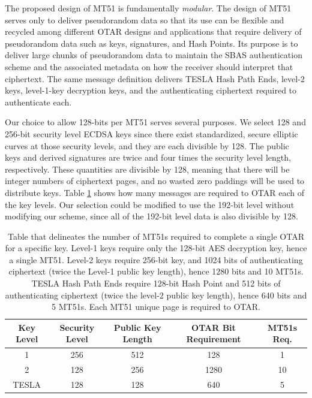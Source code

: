 \documentclass[letterpaper,times]{IONconf/IONconf}
\begin{document}
The proposed design of MT51 is fundamentally {\em modular}.
The design of MT51 serves only to deliver pseudorandom data so that its use can be flexible and recycled among different OTAR designs and applications that require delivery of pseudorandom data such as keys, signatures, and Hash Points. 
Its purpose is to deliver large chunks of pseudorandom data to maintain the SBAS authentication scheme and the associated metadata on how the receiver should interpret that ciphertext.
The same message definition delivers TESLA Hash Path Ends, level-2 keys, level-1-key decryption keys, and the authenticating ciphertext required to authenticate each.

Our choice to allow 128-bits per MT51 serves several purposes.
We select 128 and 256-bit security level ECDSA keys since there exist standardized, secure elliptic curves at those security levels, and they are each divisible by 128.
The public keys and derived signatures are twice and four times the security level length, respectively.
These quantities are divisible by 128, meaning that there will be integer numbers of ciphertext pages, and no wasted zero paddings will be used to distribute keys.
Table \ref{tab: ciphertext lengths} shows how many messages are required to OTAR each of the key levels.
Our selection could be modified to use the 192-bit level without modifying our scheme, since all of the 192-bit level data is also divisible by 128.
\begin{table}[H]
\center
\begin{tabular}{|c|c|c|c|c|} \hline
	Key Level & Security Level & Public Key Length & OTAR Bit Requirement & MT51s Req. \\ \hline
	    1 & 256 & 512 &  128 & 1 \\ \hline
	    2 & 128 & 256 & 1280 & 10\\ \hline
	TESLA & 128 & 128 &  640 & 5 \\ \hline
\end{tabular}
\caption{Table that delineates the number of MT51s required to complete a single OTAR for a specific key. Level-1 keys require only the 128-bit AES decryption key, hence a single MT51. Level-2 keys require 256-bit key, and 1024 bits of authenticating ciphertext (twice the Level-1 public key length), hence 1280 bits and 10 MT51s. TESLA Hash Path Ends require 128-bit Hash Point and 512 bits of authenticating ciphertext (twice the level-2 public key length), hence 640 bits and 5 MT51s. Each MT51 unique page is required to OTAR.}
\label{tab: ciphertext lengths}
\end{table}
\end{document}
